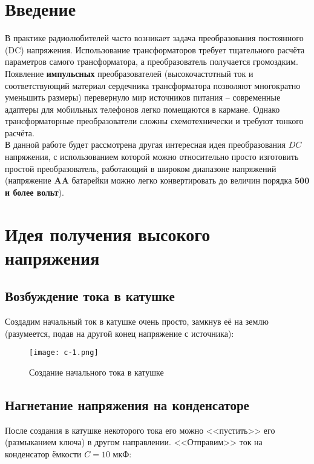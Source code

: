 \documentclass{letask}
\begin{document}


\section{Введение}

В практике радиолюбителей часто возникает задача преобразования постоянного (DC) напряжения. Использование трансформаторов требует тщательного расчёта параметров самого трансформатора, а преобразователь получается громоздким. Появление \textbf{импульсных} преобразователей (высокочастотный ток и соответствующий материал сердечника трансформатора позволяют многократно уменьшить размеры) перевернуло мир источников питания -- современные адаптеры для мобильных телефонов легко помещаются в кармане. Однако трансформаторные преобразователи сложны схемотехнически и требуют тонкого расчёта.\\

В данной работе будет рассмотрена другая интересная идея преобразования $DC$ напряжения, с использованием которой можно относительно просто изготовить простой преобразователь, работающий в широком диапазоне напряжений (напряжение \textbf{AA} батарейки можно легко конвертировать до величин порядка \textbf{$\mathbf{500}$ и более вольт}).\\


\section*{Идея получения высокого напряжения}
\subsection*{Возбуждение тока в катушке}

Создадим начальный ток в катушке очень просто, замкнув её на землю (разумеется, подав на другой конец напряжение с источника):\\



\begin{figure}[h!]
\centering
\texttt{[image: c-1.png]}
\caption{Создание начального тока в катушке}
\end{figure}

\subsection*{Нагнетание напряжения на конденсаторе}

После создания в катушке некоторого тока его можно <<пустить>> его (размыканием ключа) в другом направлении. <<Отправим>> ток на конденсатор ёмкости $C = 10$ мкФ:\\
\end{document}
